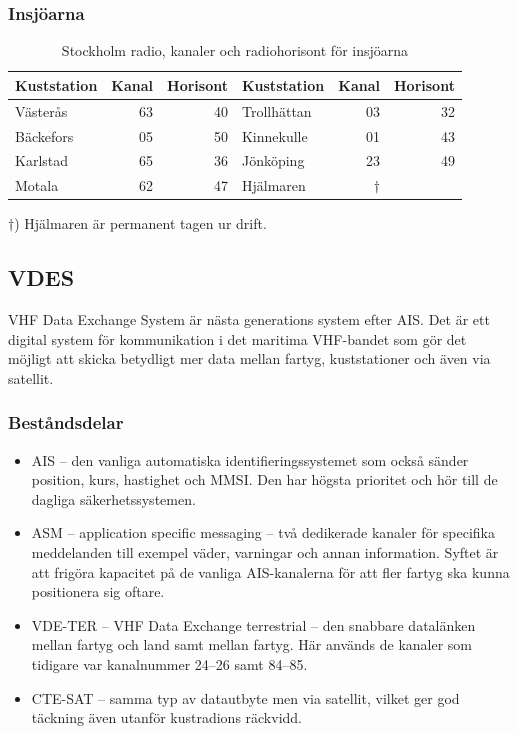 \subsubsection{Insjöarna}

\begin{table}[H]
\centering
\begin{tabular}{lrr|lrr}
\textbf{Kuststation} & \textbf{Kanal} & \textbf{Horisont} &
\textbf{Kuststation} & \textbf{Kanal} & \textbf{Horisont} \\
\hline
Västerås  & 63 & 40 & Trollhättan & 03 & 32 \\
Bäckefors & 05 & 50 & Kinnekulle  & 01 & 43 \\
Karlstad  & 65 & 36 & Jönköping   & 23 & 49 \\
Motala    & 62 & 47 & Hjälmaren     & $\dagger$  &    \\
\end{tabular}
\caption{Stockholm radio, kanaler och radiohorisont för insjöarna}
\end{table}

$\dagger$) Hjälmaren är permanent tagen ur drift.


\subsection{VDES}

VHF Data Exchange System är nästa generations system efter AIS. Det är ett
digital system för kommunikation i det maritima VHF-bandet som gör det
möjligt att skicka betydligt mer data mellan fartyg, kuststationer och
även via satellit.

\subsubsection{Beståndsdelar}

\begin{itemize}
\item AIS -- den vanliga automatiska identifieringssystemet som också
  sänder position, kurs, hastighet och MMSI. Den har högsta prioritet
  och hör till de dagliga säkerhetssystemen.
\item ASM -- application specific messaging -- två dedikerade kanaler
  för specifika meddelanden till exempel väder, varningar och annan
  information. Syftet är att frigöra kapacitet på de vanliga
  AIS-kanalerna för att fler fartyg ska kunna positionera sig oftare.
\item VDE-TER -- VHF Data Exchange terrestrial -- den snabbare
  datalänken mellan fartyg och land samt mellan fartyg. Här används de
  kanaler som tidigare var kanalnummer 24--26 samt 84--85.
\item CTE-SAT -- samma typ av datautbyte men via satellit, vilket ger
  god täckning även utanför kustradions räckvidd.
\end{itemize}

